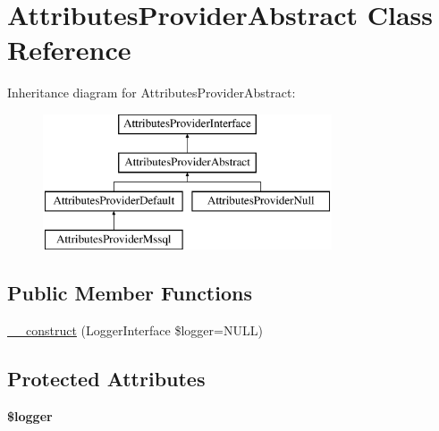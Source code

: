\hypertarget{class_pes_1_1_database_1_1_handler_1_1_attributes_provider_1_1_attributes_provider_abstract}{}\section{Attributes\+Provider\+Abstract Class Reference}
\label{class_pes_1_1_database_1_1_handler_1_1_attributes_provider_1_1_attributes_provider_abstract}
Inheritance diagram for Attributes\+Provider\+Abstract\+:\begin{figure}[H]
\begin{center}
\leavevmode
\includegraphics[height=4.000000cm]{class_pes_1_1_database_1_1_handler_1_1_attributes_provider_1_1_attributes_provider_abstract}
\end{center}
\end{figure}
\subsection*{Public Member Functions}
\begin{DoxyCompactItemize}
\item 
\mbox{\hyperlink{class_pes_1_1_database_1_1_handler_1_1_attributes_provider_1_1_attributes_provider_abstract_a4d086b03f47931c183f0414bf2da5103}{\+\_\+\+\_\+construct}} (Logger\+Interface \$logger=N\+U\+LL)
\end{DoxyCompactItemize}
\subsection*{Protected Attributes}
\begin{DoxyCompactItemize}
\item 
\mbox{\label{class_pes_1_1_database_1_1_handler_1_1_attributes_provider_1_1_attributes_provider_abstract_aebfec76216371ef236acc5910e90933d}} 
{\bfseries \$logger}
\end{DoxyCompactItemize}


